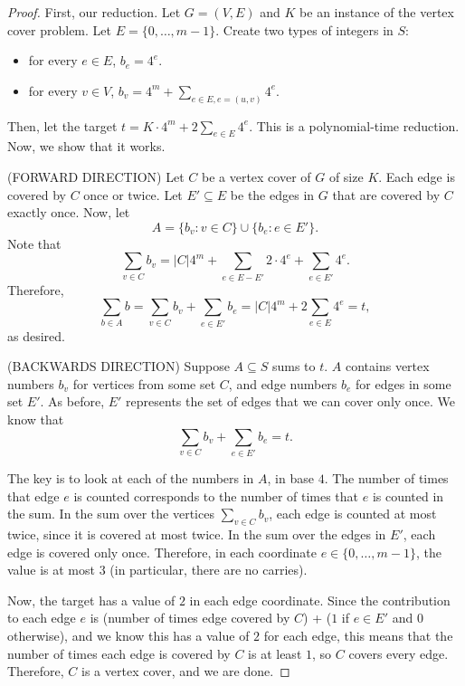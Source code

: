 \begin{proof}
First, our reduction. Let $G=(V,E)$ and $K$ be an instance of the vertex cover problem. Let $E=\{0,\hdots,m-1\}$. Create two types of integers in $S$: 
\begin{itemize}
    \item for every $e\in E$, $b_e = 4^e$.
    \item for every $v\in V$, $b_v = 4^m+\sum_{e\in E, e=(u,v)}4^e$.
\end{itemize}
Then, let the target $t=K\cdot 4^m + 2\sum_{e\in E}4^e$. This is a polynomial-time reduction. Now, we show that it works. 

\hrulebar

(FORWARD DIRECTION) Let $C$ be a vertex cover of $G$ of size $K$. Each edge is covered by $C$ once or twice. Let $E'\subseteq E$ be the edges in $G$ that are covered by $C$ exactly once. Now, let 
\[A = \{b_v : v\in C\}\cup \{b_e : e\in E'\}.\]
Note that 
\[\sum_{v\in C}b_v = \vert C\vert 4^m + \sum_{e\in E-E'}2\cdot 4^e + \sum_{e\in E'}4^e.\]
Therefore, 
\[\sum_{b\in A}b = \sum_{v\in C}b_v + \sum_{e\in E'}b_e = \vert C\vert 4^m + 2\sum_{e\in E}4^e = t,\]
as desired. 

\hrulebar

(BACKWARDS DIRECTION) Suppose $A\subseteq S$ sums to $t$. $A$ contains vertex numbers $b_v$ for vertices from some set $C$, and edge numbers $b_e$ for edges in some set $E'$. As before, $E'$ represents the set of edges that we can cover only once. We know that 
\[\sum_{v\in C}b_v + \sum_{e\in E'}b_e=t.\]

The key is to look at each of the numbers in $A$, in base $4$. The number of times that edge $e$ is counted corresponds to the number of times that $e$ is counted in the sum. In the sum over the vertices $\sum_{v\in C}b_v$, each edge is counted at most twice, since it is covered at most twice. In the sum over the edges in $E'$, each edge is covered only once. Therefore, in each coordinate $e\in \{0, \hdots, m-1\}$, the value is at most $3$ (in particular, there are no carries). 

Now, the target has a value of $2$ in each edge coordinate. Since the contribution to each edge $e$ is (number of times edge covered by $C$) + ($1$ if $e\in E'$ and $0$ otherwise), and we know this has a value of $2$ for each edge, this means that the number of times each edge is covered by $C$ is at least $1$, so $C$ covers every edge. Therefore, $C$ is a vertex cover, and we are done. 
\end{proof}